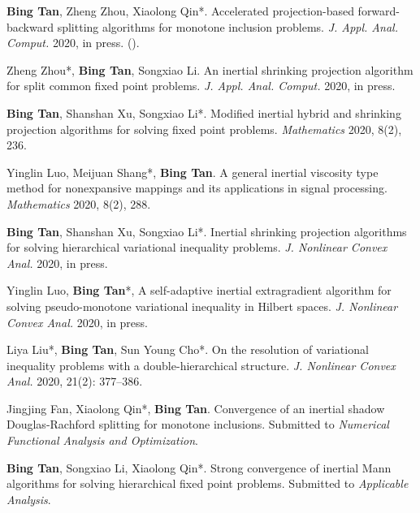 

\begin{addtab}
\end{addtab}

\begin{tabitemize}
\item \textbf{Bing Tan}, Zheng Zhou, {Xiaolong Qin}*. Accelerated projection-based forward-backward splitting algorithms for monotone inclusion problems. \textit{J. Appl. Anal. Comput.} 2020, in press. ().

\item {{Zheng Zhou}*, \textbf{Bing Tan}, Songxiao Li. An inertial shrinking projection algorithm for split common fixed point problems. \textit{J. Appl. Anal. Comput.} 2020, in press.}

\item{\textbf{Bing Tan}, Shanshan Xu, {Songxiao Li}*. Modified inertial hybrid and shrinking projection algorithms for solving fixed point problems. \textit{Mathematics} 2020, 8(2), 236.  }

\item {Yinglin Luo, {Meijuan Shang}*, \textbf{Bing Tan}. A general inertial viscosity type method for nonexpansive mappings and its applications in signal processing. \textit{Mathematics} 2020, 8(2), 288.}

\item {\textbf{Bing Tan}, Shanshan Xu, {Songxiao Li}*. Inertial shrinking projection algorithms for solving hierarchical variational inequality problems. \textit{J. Nonlinear Convex Anal.} 2020, in press.}

\item {Yinglin Luo, \textbf{Bing Tan}*, A self-adaptive inertial extragradient algorithm for solving pseudo-monotone variational inequality in Hilbert spaces. \textit{J. Nonlinear Convex Anal.} 2020, in press.}

\item {{Liya Liu}*, \textbf{Bing Tan}, {Sun Young Cho}*. On the resolution of variational inequality problems with a double-hierarchical structure. \textit{J. Nonlinear Convex Anal.} 2020, 21(2): 377--386.}
\end{tabitemize}

\begin{addtab}
\end{addtab}

\begin{tabitemize}
\item {Jingjing Fan, {Xiaolong Qin}*, \textbf{Bing Tan}. Convergence of an inertial shadow Douglas-Rachford splitting for monotone inclusions. Submitted to \textit{Numerical Functional Analysis and Optimization}.}

\item {\textbf{Bing Tan}, Songxiao Li, {Xiaolong Qin}*. Strong convergence of inertial Mann algorithms for solving hierarchical fixed point problems. Submitted to \textit{Applicable Analysis}.}

\end{tabitemize}




